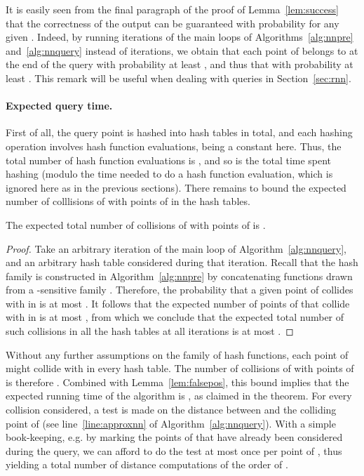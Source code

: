 \begin{remark}\label{rem:increase_n}
It is easily seen from the final paragraph of the proof of
Lemma~\ref{lem:success} that the correctness of the output can be
guaranteed with probability  for any given
. Indeed, by running  iterations of the
main loops of Algorithms~\ref{alg:nnpre} and~\ref{alg:nnquery} instead
of  iterations, we obtain that each point of
 belongs to  at the end of the query with probability
at least , and thus that  with probability at least . This
remark will be useful when dealing with \rnn queries in
Section~\ref{sec:rnn}.
\end{remark}

\paragraph{Expected query time.}
First of all, the query point  is hashed into  hash tables in total, and each hashing
operation involves  hash function evaluations,  being a constant
here. Thus, the total number of hash function evaluations is , and so is the total time
spent hashing  (modulo the time needed to do a hash function
evaluation, which is ignored here as in the previous sections). There
remains to bound the expected number of colllisions of  with points
of  in the hash tables.
\begin{lem} \label{lem:falsepos}
The expected total number of collisions of  with points of
 is .
\end{lem}
\begin{proof}
 Take an arbitrary iteration  of the main loop of
 Algorithm~\ref{alg:nnquery}, and an arbitrary hash table 
 considered during that iteration. Recall that the hash family  is
 constructed in Algorithm~\ref{alg:nnpre} by concatenating
  functions drawn
 from a -sensitive family . Therefore, the
 probability that a given point of 
 collides with  in  is at most .  It follows that the expected number of points
 of  that collide with  in  is
 at most , from which we conclude that the expected
 total number of such collisions in all the hash tables at all
 iterations is at most .
\end{proof}

Without any further assumptions on the family  of hash functions,
each point of  might collide with  in every
hash table. The number of collisions of  with points of
 is therefore . Combined with
Lemma~\ref{lem:falsepos}, this bound implies that the expected running
time of the algorithm is ,
as claimed in the theorem.
For every collision considered, a test is made on the distance between
 and the colliding point of  (see line~\ref{line:approxnn} of
Algorithm~\ref{alg:nnquery}). With a simple book-keeping, e.g. by
marking the points of  that have already been considered during the
query, we can afford to do the test at most once per point of ,
thus yielding a total number of distance computations of the order of
.

